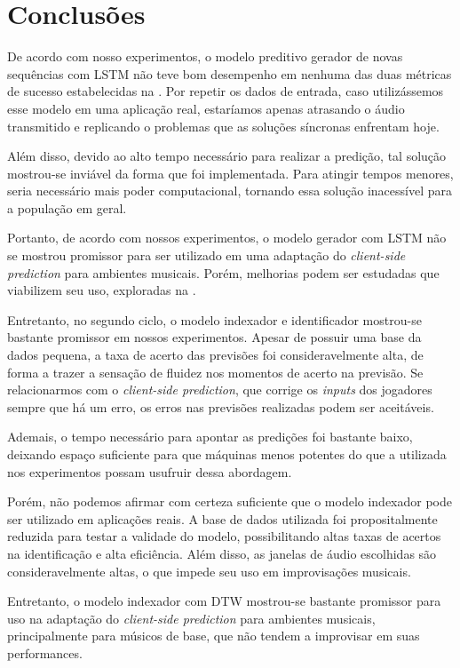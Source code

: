 \chapter{Conclusões}
\label{chap:conclusion}

De acordo com nosso experimentos, o modelo preditivo gerador de novas sequências com LSTM não teve bom desempenho em nenhuma das duas métricas de sucesso estabelecidas na . Por repetir os dados de entrada, caso utilizássemos esse modelo em uma aplicação real, estaríamos apenas atrasando o áudio transmitido e replicando o problemas que as soluções síncronas enfrentam hoje.

Além disso, devido ao alto tempo necessário para realizar a predição, tal solução mostrou-se inviável da forma que foi implementada. Para atingir tempos menores, seria necessário mais poder computacional, tornando essa solução inacessível para a população em geral.

Portanto, de acordo com nossos experimentos, o modelo gerador com LSTM não se mostrou promissor para ser utilizado em uma adaptação do \textit{client-side prediction} para ambientes musicais. Porém, melhorias podem ser estudadas que viabilizem seu uso, exploradas na .

Entretanto, no segundo ciclo, o modelo indexador e identificador mostrou-se bastante promissor em nossos experimentos. Apesar de possuir uma base da dados pequena, a taxa de acerto das previsões foi consideravelmente alta, de forma a trazer a sensação de fluidez nos momentos de acerto na previsão. Se relacionarmos com o \textit{client-side prediction}, que corrige os \textit{inputs} dos jogadores sempre que há um erro, os erros nas previsões realizadas podem ser aceitáveis.

Ademais, o tempo necessário para apontar as predições foi bastante baixo, deixando espaço suficiente para que máquinas menos potentes do que a utilizada nos experimentos possam usufruir dessa abordagem.

Porém, não podemos afirmar com certeza suficiente que o modelo indexador pode ser utilizado em aplicações reais. A base de dados utilizada foi propositalmente reduzida para testar a validade do modelo, possibilitando altas taxas de acertos na identificação e alta eficiência. Além disso, as janelas de áudio escolhidas são consideravelmente altas, o que impede seu uso em improvisações musicais.

Entretanto, o modelo indexador com DTW mostrou-se bastante promissor para uso na adaptação do \textit{client-side prediction} para ambientes musicais, principalmente para músicos de base, que não tendem a improvisar em suas performances.

